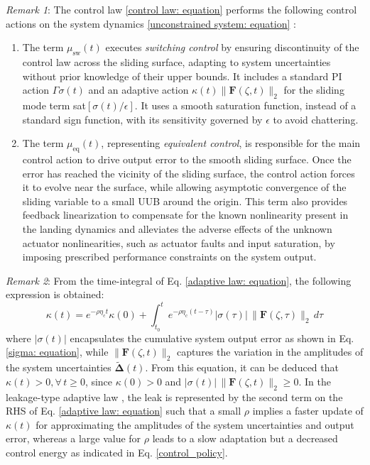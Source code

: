 \documentclass{IEEEtaes}
\begin{document}
\textit{Remark 1}: The control law \eqref{control law: equation} performs the following control actions on the system dynamics \eqref{unconstrained system: equation} \cite{eker2010}:
\begin{enumerate}
    \item The term $\mu_{\text{sw}}(t)$ executes \textit{switching control} by ensuring discontinuity of the control law across the sliding surface, adapting to system uncertainties without prior knowledge of their upper bounds. It includes a standard PI action $\Gamma \sigma(t)$ and an adaptive action $\kappa(t) \lVert \boldsymbol{F}(\zeta,t) \rVert_2$ for the sliding mode term sat$[{\sigma(t)}/{\epsilon}]$. It uses a smooth saturation function, instead of a standard sign function, with its sensitivity governed by $\epsilon$ to avoid chattering. 
    \item The term $\mu_{\text{eq}}(t)$, representing \textit{equivalent control}, is responsible for the main control action to drive output error to the smooth sliding surface. Once the error has reached the vicinity of the sliding surface, the control action forces it to evolve near the surface, while allowing asymptotic convergence of the sliding variable to a small UUB around the origin. This term also provides feedback linearization to compensate for the known nonlinearity present in the landing dynamics and alleviates the adverse effects of the unknown actuator nonlinearities, such as actuator faults and input saturation, by imposing prescribed performance constraints on the system output.
\end{enumerate}

\textit{Remark 2}: From the time-integral of Eq. \eqref{adaptive law: equation}, the following expression is obtained:
\begin{equation} \label{kappa: equation}
    \kappa(t) = e^{{-}\rho \eta_{\text{c}} t} \kappa(0) + \int_{t_0}^{t} e^{{-}\rho \eta_{\text{c}} (t {-} \tau)} \lvert \sigma(\tau) \rvert \,\lVert \boldsymbol{F}(\zeta,\tau) \rVert_2 \,d\tau
\end{equation}
where $\lvert \sigma(t) \rvert$ encapsulates the cumulative system output error as shown in Eq. \eqref{sigma: equation}, while $\lVert \boldsymbol{F}(\zeta,t) \rVert_2$ captures the variation in the amplitudes of the system uncertainties $\tilde{\boldsymbol{\Delta}}(t)$. From this equation, it can be deduced that $\kappa(t) > 0, \forall \, t \geq 0$, since $\kappa(0) > 0$ and $\lvert \sigma(t) \rvert \,\lVert \boldsymbol{F}(\zeta,t) \rVert_2 \geq 0$. In the leakage-type adaptive law \cite{shao2021}, the leak is represented by the second term on the RHS of Eq. \eqref{adaptive law: equation} such that a small $\rho$ implies a faster update of $\kappa(t)$ for approximating the amplitudes of the system uncertainties and output error, whereas a large value for $\rho$ leads to a slow adaptation but a decreased control energy as indicated in Eq. \eqref{control_policy}.
\end{document}
